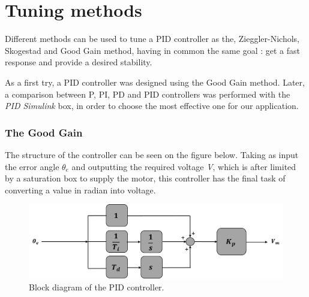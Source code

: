 \section{Tuning methods}
Different methods can be used to tune a PID controller as the, Zieggler-Nichols, Skogestad and Good Gain method, having in common the same goal : get a fast response and provide a desired stability.\par
As a first try, a PID controller was designed using the Good Gain method. Later, a comparison between P, PI, PD and PID controllers was performed with the \emph{PID Simulink} box, in order to choose the most effective one for our application.\par 	

\subsubsection{The Good Gain}


The structure of the controller can be seen on the figure below. Taking as input the error angle \textbf{$\theta_{e}$} and outputting the required voltage \textit{V}, which is after limited by a saturation box to supply the motor, this controller has the final task of converting a value in radian into voltage.\par

\begin{figure}[H]
  \centering
  \includegraphics[scale=0.6]{figures/controller_model.png}
  \caption[LABEL] {Block diagram of the PID controller.}
\end{figure}
  
